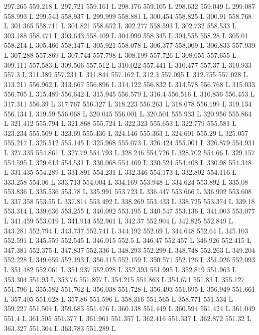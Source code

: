 297.265 559.218 L
297.721 559.161 L
298.176 559.105 L
298.632 559.049 L
299.087 558.993 L
299.543 558.937 L
299.999 558.881 L
300.454 558.825 L
300.91 558.768 L
301.365 558.711 L
301.821 558.652 L
302.277 558.593 L
302.732 558.533 L
303.188 558.471 L
303.643 558.409 L
304.099 558.345 L
304.555 558.28 L
305.01 558.214 L
305.466 558.147 L
305.921 558.078 L
306.377 558.009 L
306.833 557.939 L
307.288 557.869 L
307.744 557.798 L
308.199 557.726 L
308.655 557.655 L
309.111 557.583 L
309.566 557.512 L
310.022 557.441 L
310.477 557.37 L
310.933 557.3 L
311.389 557.231 L
311.844 557.162 L
312.3 557.095 L
312.755 557.028 L
313.211 556.962 L
313.667 556.896 L
314.122 556.832 L
314.578 556.768 L
315.033 556.705 L
315.489 556.642 L
315.945 556.579 L
316.4 556.516 L
316.856 556.453 L
317.311 556.39 L
317.767 556.327 L
318.223 556.263 L
318.678 556.199 L
319.134 556.134 L
319.59 556.068 L
320.045 556.001 L
320.501 555.933 L
320.956 555.864 L
321.412 555.794 L
321.868 555.724 L
322.323 555.653 L
322.779 555.581 L
323.234 555.509 L
323.69 555.436 L
324.146 555.363 L
324.601 555.29 L
325.057 555.217 L
325.512 555.145 L
325.968 555.073 L
326.424 555.001 L
326.879 554.931 L
327.335 554.861 L
327.79 554.793 L
328.246 554.726 L
328.702 554.66 L
329.157 554.595 L
329.613 554.531 L
330.068 554.469 L
330.524 554.408 L
330.98 554.348 L
331.435 554.289 L
331.891 554.231 L
332.346 554.173 L
332.802 554.116 L
333.258 554.06 L
333.713 554.004 L
334.169 553.948 L
334.624 553.892 L
335.08 553.836 L
335.536 553.78 L
335.991 553.723 L
336.447 553.666 L
336.902 553.608 L
337.358 553.55 L
337.814 553.492 L
338.269 553.433 L
338.725 553.374 L
339.18 553.314 L
339.636 553.255 L
340.092 553.195 L
340.547 553.136 L
341.003 553.077 L
341.459 553.019 L
341.914 552.961 L
342.37 552.904 L
342.825 552.849 L
343.281 552.794 L
343.737 552.741 L
344.192 552.69 L
344.648 552.64 L
345.103 552.591 L
345.559 552.545 L
346.015 552.5 L
346.47 552.457 L
346.926 552.415 L
347.381 552.375 L
347.837 552.336 L
348.293 552.299 L
348.748 552.263 L
349.204 552.228 L
349.659 552.193 L
350.115 552.159 L
350.571 552.126 L
351.026 552.093 L
351.482 552.061 L
351.937 552.028 L
352.393 551.995 L
352.849 551.963 L
353.304 551.93 L
353.76 551.897 L
354.215 551.863 L
354.671 551.83 L
355.127 551.796 L
355.582 551.762 L
356.038 551.728 L
356.493 551.695 L
356.949 551.661 L
357.405 551.628 L
357.86 551.596 L
358.316 551.565 L
358.771 551.534 L
359.227 551.504 L
359.683 551.476 L
360.138 551.449 L
360.594 551.424 L
361.049 551.4 L
361.505 551.377 L
361.961 551.357 L
362.416 551.337 L
362.872 551.32 L
363.327 551.304 L
363.783 551.289 L
